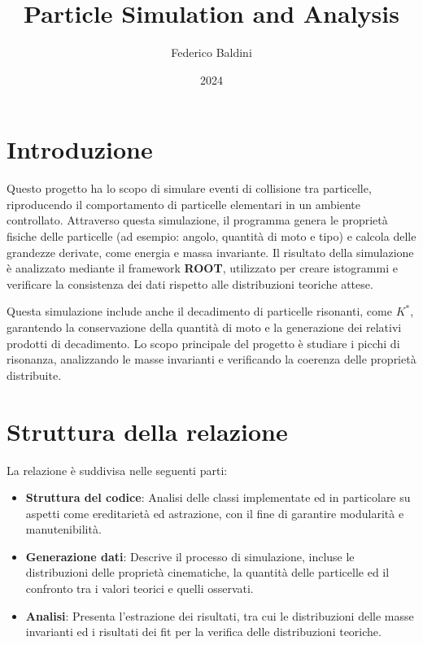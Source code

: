 \documentclass[a4paper,11pt]{article}
\title{Particle Simulation and Analysis}
\author{Federico Baldini}
\date{2024}
\begin{document}
\maketitle
\newpage

\tableofcontents
\newpage

\section{Introduzione}

Questo progetto ha lo scopo di simulare eventi di collisione tra particelle, riproducendo il comportamento di particelle elementari in un ambiente controllato. Attraverso questa simulazione, il programma genera le proprietà fisiche delle particelle (ad esempio: angolo, quantità di moto e tipo) e calcola delle grandezze derivate, come energia e massa invariante. Il risultato della simulazione è analizzato mediante il framework \textbf{ROOT}, utilizzato per creare istogrammi e verificare la consistenza dei dati rispetto alle distribuzioni teoriche attese.

Questa simulazione include anche il decadimento di particelle risonanti, come \( K^* \), garantendo la conservazione della quantità di moto e la generazione dei relativi prodotti di decadimento. Lo scopo principale del progetto è studiare i picchi di risonanza, analizzando le masse invarianti e verificando la coerenza delle proprietà distribuite.

\section{Struttura della relazione}

La relazione è suddivisa nelle seguenti parti:

\begin{itemize}
    \item \textbf{Struttura del codice}: Analisi delle classi implementate ed in particolare su aspetti come ereditarietà ed astrazione, con il fine di garantire modularità e manutenibilità.
    \item \textbf{Generazione dati}: Descrive il processo di simulazione, incluse le distribuzioni delle proprietà cinematiche, la quantità delle particelle ed il confronto tra i valori teorici e quelli osservati.
    \item \textbf{Analisi}: Presenta l'estrazione dei risultati, tra cui le distribuzioni delle masse invarianti ed i risultati dei fit per la verifica delle distribuzioni teoriche.
\end{itemize}
\end{document}
